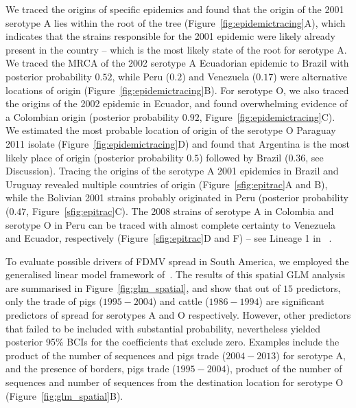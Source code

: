 \documentclass[10pt]{article}
\begin{document}
We traced the origins of specific epidemics and found that the origin of the 2001 serotype A lies within the root of the tree (Figure~\ref{fig:epidemictracing}A), which indicates that the strains responsible for the 2001 epidemic were likely already present in the country -- which is the most likely state of the root for serotype A.
We traced the MRCA of the 2002 serotype A Ecuadorian epidemic to Brazil with posterior probability $0.52$, while Peru ($0.2$) and Venezuela ($0.17$) were alternative locations of origin (Figure~\ref{fig:epidemictracing}B).
For serotype O, we also traced the origins of the 2002 epidemic in Ecuador, and found overwhelming evidence of a Colombian origin (posterior probability $0.92$, Figure~\ref{fig:epidemictracing}C).
We estimated the most probable location of origin of the serotype O Paraguay 2011 isolate (Figure~\ref{fig:epidemictracing}D) and found that Argentina is the most likely place of origin (posterior probability $0.5$) followed by Brazil ($0.36$, see Discussion).
Tracing the origins of the serotype A 2001 epidemics in Brazil and Uruguay revealed multiple countries of origin (Figure~\ref{sfig:epitrac}A and B), while the Bolivian 2001 strains probably originated in Peru (posterior probability ($0.47$, Figure~\ref{sfig:epitrac}C).
The 2008 strains of serotype A in Colombia and serotype O in Peru can be traced with almost complete certainty to Venezuela and Ecuador, respectively (Figure~\ref{sfig:epitrac}D and F) -- see Lineage 1 in ~\cite{Malirat2012}.

To evaluate possible drivers of FDMV spread in South America, we employed the generalised linear model framework of~\cite{Lemey2014}.
The results of this spatial GLM analysis are summarised in Figure~\ref{fig:glm_spatial}, and show that out of $15$ predictors, only the trade of pigs ($1995-2004$) and cattle ($1986-1994$) are significant predictors of spread for serotypes A and O respectively.
However, other predictors that failed to be included with substantial probability, nevertheless yielded posterior 95\% BCIs for the coefficients that exclude zero.
Examples include the product of the number of sequences and pigs trade ($2004-2013$) for serotype A, and the presence of borders, pigs trade ($1995-2004$), product of the number of sequences and number of sequences from the destination location for serotype O (Figure~\ref{fig:glm_spatial}B). %
\end{document}
